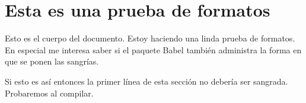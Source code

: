 \documentclass[a4paper,12pt]{article}
\begin{document}
\section{Esta es una prueba de formatos}
Esto es el cuerpo del documento. Estoy haciendo una linda prueba de formatos. En especial me interesa saber si el paquete Babel tambi\'en administra la forma en que se ponen las sangr\'ias.

Si esto es as\'i entonces la primer l\'inea de esta secci\'on no deber\'ia ser sangrada. Probaremos al compilar.
\end{document}
